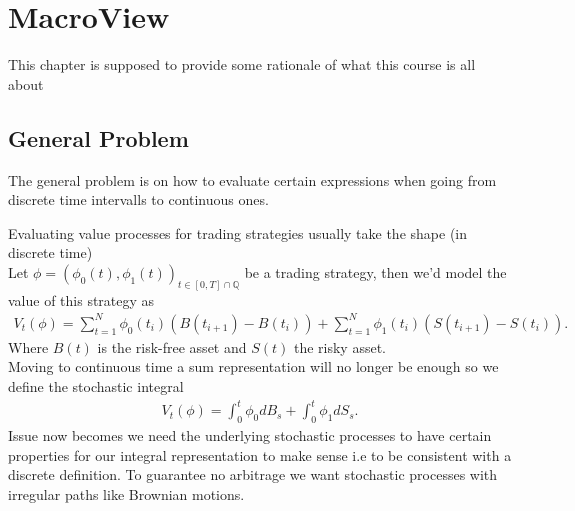 \chapter{MacroView}
This chapter is supposed to provide some rationale of what this course is all about
\section{General Problem}
The general problem is on how to evaluate certain expressions when going from discrete time intervalls
to continuous ones.
\begin{example}
	Evaluating value processes for trading strategies usually take the shape (in discrete time) \\[1ex]
	Let $\phi  = (\phi_{0}(t),\phi_1(t))_{t \in [0,T] \cap \mathbb{Q}}$ be a trading strategy, then we'd model the value of this strategy as
	\begin{align*}
    V_t(\phi ) = \sum_{t=1}^{N} \phi_0(t_i)(B(t_{i+1}) - B(t_{i})) +  \sum_{t=1}^{N} \phi_1(t_i)(S(t_{i+1}) - S(t_{i}))
	.\end{align*}
  Where $B(t)$ is the risk-free asset and $S(t)$ the risky asset. \\[1ex]
  Moving to continuous time a sum representation will no longer be enough so we define the stochastic integral 
  \begin{align*}
    V_t(\phi )= \int_0^{t} \phi_{0} dB_s + \int_0^{t} \phi_1 dS_s
  .\end{align*}
  Issue now becomes we need the underlying stochastic processes to have certain properties for our integral representation to make 
  sense i.e to be consistent with a discrete definition. To guarantee no arbitrage we want stochastic processes with irregular paths 
  like Brownian motions.
\end{example}
